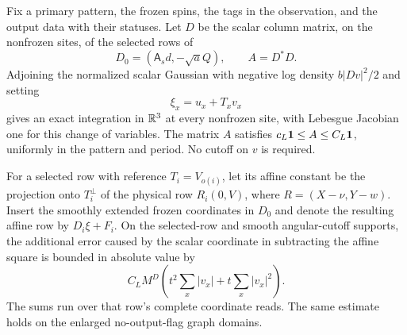 \begin{lemma}
\label{lem:rg-ambient}
Fix a primary pattern, the frozen spins, the tags in the observation,
and the output data with their statuses.  Let $D$ be the scalar column
matrix, on the nonfrozen sites, of the selected rows of
\[
 D_0=(\mathsf A_s d,-\sqrt a Q),\qquad A=D^*D.
\]
Adjoining the normalized scalar Gaussian with negative log density
$b|Dv|^2/2$ and setting
\[
 \xi_x=u_x+T_xv_x
\]
gives an exact integration in $\mathbb R^3$ at every nonfrozen site, with
Lebesgue Jacobian one for this change of variables.  The matrix $A$
satisfies $c_L\mathbf 1\le A\le C_L\mathbf 1$, uniformly in the pattern and
period.  No cutoff on $v$ is required.

For a selected row with reference $T_i=V_{o(i)}$, let its affine
constant be the projection onto $T_i^\perp$ of the physical row
$R_i(0,V)$, where $R=(X-\nu,Y-w)$.  Insert the smoothly extended
frozen coordinates in $D_0$ and denote the resulting affine row by
$D_i\xi+F_i$.  On the selected-row and smooth angular-cutoff supports,
the additional error caused by the scalar coordinate in subtracting
the affine square is bounded in absolute value by
\begin{equation}
 C_LM^D\left(t^2\sum_x|v_x|+t\sum_x|v_x|^2\right).
 \label{eq:orig-6}
\end{equation}
The sums run over that row's complete coordinate reads.  The same
estimate holds on the enlarged no-output-flag graph domains.
\end{lemma}

